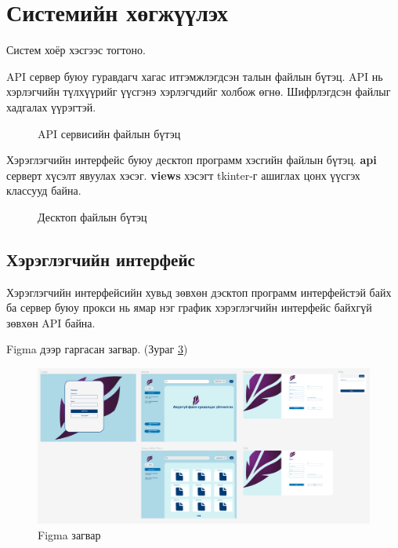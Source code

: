 \section{Системийн хөгжүүлэх}
Систем хоёр хэсгээс тогтоно.

API сервер буюу гуравдагч хагас итгэмжлэгдсэн талын файлын бүтэц. API нь хэрлэгчийн түлхүүрийг үүсгэнэ хэрлэгчдийг холбож өгнө. Шифрлэгдсэн файлыг хадгалах үүрэгтэй.
\begin{figure}[H]
    \label{fig:service_structure}
    \caption{API сервисийн файлын бүтэц}
\end{figure}

Хэрэглэгчийн интерфейс буюу десктоп программ хэсгийн файлын бүтэц. \textbf{api} серверт хүсэлт явуулах хэсэг. \textbf{views} хэсэгт tkinter-г ашиглах цонх үүсгэх классууд байна.

\begin{figure}[H]
    \label{fig:desktop_structure}
    \caption{Десктоп файлын бүтэц}
\end{figure}

\subsection*{Хэрэглэгчийн интерфейс}
Хэрэглэгчийн интерфейсийн хувьд зөвхөн дэсктоп программ интерфейстэй байх ба сервер буюу прокси нь ямар нэг график хэрэглэгчийн интерфейс байхгүй зөвхөн API байна. 

Figma дээр гаргасан загвар. (Зураг \ref*{fig:figma})
\begin{figure}[H]
    \centering
    \includegraphics[scale=0.3]{Figures/ui/figma.png}
    \caption{Figma загвар}
    \label{fig:figma}
\end{figure}

